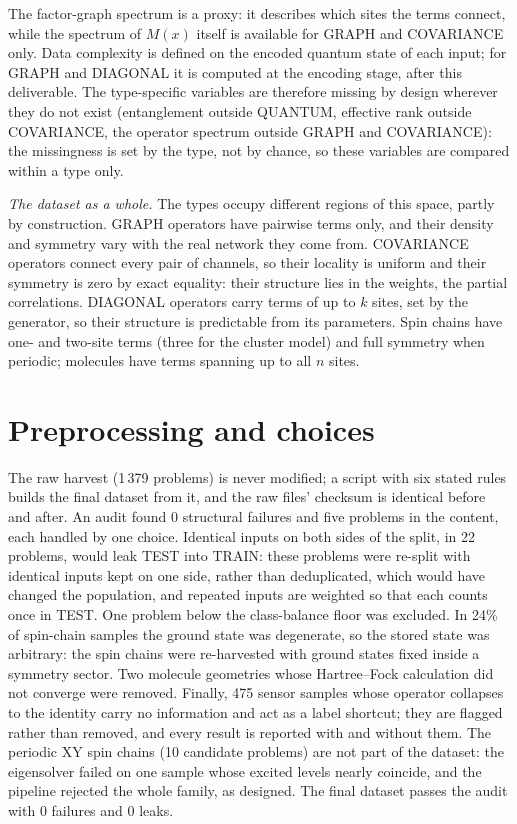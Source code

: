 \documentclass[10pt,a4paper]{article}
\begin{document}
The factor-graph spectrum is a proxy: it describes which sites the terms connect, while the spectrum of $M(x)$
itself is available for GRAPH and COVARIANCE only. Data complexity is defined on the encoded quantum state of
each input; for GRAPH and DIAGONAL it is computed at the encoding stage, after this deliverable. The
type-specific variables are therefore missing by design wherever they do not exist (entanglement outside
QUANTUM, effective rank outside COVARIANCE, the operator spectrum outside GRAPH and COVARIANCE): the missingness
is set by the type, not by chance, so these variables are compared within a type only.

\emph{The dataset as a whole.} The types occupy different regions of this space, partly by construction. GRAPH
operators have pairwise terms only, and their density and symmetry vary with the real network they come from.
COVARIANCE operators connect every pair of channels, so their locality is uniform and their symmetry is zero by
exact equality: their structure lies in the weights, the partial correlations. DIAGONAL operators carry terms of
up to $k$ sites, set by the generator, so their structure is predictable from its parameters. Spin chains have
one- and two-site terms (three for the cluster model) and full symmetry when periodic; molecules have terms
spanning up to all $n$ sites.
\section{Preprocessing and choices}

The raw harvest (1\,379 problems) is never modified; a script with six stated rules builds the final dataset
from it, and the raw files' checksum is identical before and after. An audit found 0 structural failures and
five problems in the content, each handled by one choice. Identical inputs on both sides of the split, in 22
problems, would leak TEST into TRAIN: these problems were re-split with identical inputs kept on one side,
rather than deduplicated, which would have changed the population, and repeated inputs are weighted so that
each counts once in TEST. One problem below the class-balance floor was excluded. In 24\% of spin-chain
samples the ground state was degenerate, so the stored state was arbitrary: the spin chains were re-harvested
with ground states fixed inside a symmetry sector. Two molecule geometries whose Hartree--Fock calculation did
not converge were removed. Finally, 475 sensor samples whose operator collapses to the identity carry no
information and act as a label shortcut; they are flagged rather than removed, and every result is reported with
and without them. The periodic XY spin chains (10 candidate problems) are not part of the dataset: the
eigensolver failed on one sample whose excited levels nearly coincide, and the pipeline rejected the whole
family, as designed. The final dataset passes the audit with 0 failures and 0 leaks.
\end{document}
